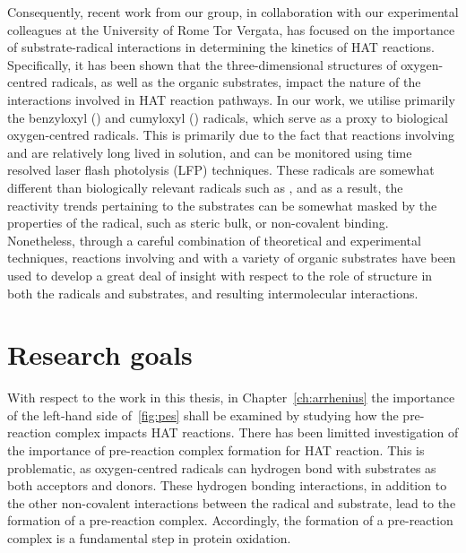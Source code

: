 Consequently, recent work from our group, in collaboration with our experimental colleagues at the University of Rome Tor Vergata, has focused on the importance of substrate-radical interactions in determining the kinetics of HAT reactions. Specifically, it has been shown that the three-dimensional structures of oxygen-centred radicals, as well as the organic substrates, impact the nature of the interactions involved in HAT reaction pathways.\cite{Salamone2015Rev} In our work, we utilise primarily the benzyloxyl (\bno) and cumyloxyl (\cumo) radicals, which serve as a proxy to biological oxygen-centred radicals. This is primarily due to the fact that reactions involving \bno and \cumo are relatively long lived in solution, and can be monitored using time resolved laser flash photolysis (LFP) techniques. These radicals are somewhat different than biologically relevant radicals such as , and as a result, the reactivity trends pertaining to the substrates can be somewhat masked by the properties of the radical, such as steric bulk,\cite{Finn2004} or non-covalent binding.\cite{Salamone2011b} Nonetheless, through a careful combination of theoretical and experimental techniques, reactions involving \bno and \cumo with a variety of organic substrates have been used to develop a great deal of insight with respect to the role of structure in both the radicals and substrates, and resulting intermolecular interactions.

\section{Research goals}

With respect to the work in this thesis, in Chapter~\ref{ch:arrhenius} the importance of the left-hand side of~\ref{fig:pes} shall be examined by studying how the pre-reaction complex impacts HAT reactions. There has been limitted investigation of the importance of pre-reaction complex formation for HAT reaction.\cite{Kreilick1966} This is problematic, as oxygen-centred radicals can hydrogen bond with substrates as both acceptors and donors.\cite{Johnson2009a} These hydrogen bonding interactions, in addition to the other non-covalent interactions between the radical and substrate, lead to the formation of a pre-reaction complex. Accordingly, the formation of a pre-reaction complex is a fundamental step in protein oxidation.

